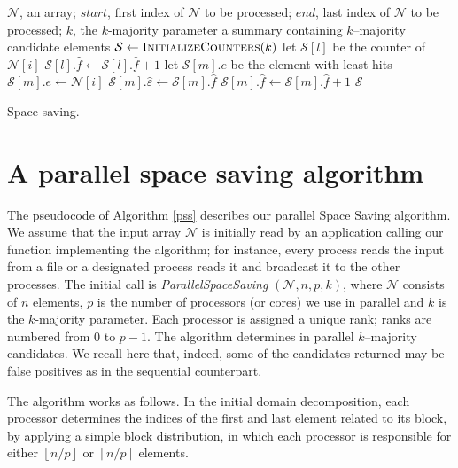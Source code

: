 \documentclass[final,3p,times]{elsarticle}
\begin{document}
\begin{algorithm}
\begin{algorithmic}[1]
\Require $\mathcal{N}$, an array; $start$, first index of $\mathcal{N}$ to be processed; $end$, last index of $\mathcal{N}$ to be processed; $k$, the $k$-majority parameter
\Ensure a summary containing $k$--majority candidate elements
\State $\mathcal{S} \leftarrow \Call{InitializeCounters}{k}$
		\State let $\mathcal{S}[l]$ be the counter of $\mathcal{N}[i]$ 
		\State $\mathcal{S}[l].\hat{f} \leftarrow \mathcal{S}[l].\hat{f} + 1$
	\Else
		\State let $\mathcal{S}[m].e$ be the element with least hits
		\State $\mathcal{S}[m].e \leftarrow \mathcal{N}[i]$ 
		\State $\mathcal{S}[m].\hat{\varepsilon} \leftarrow \mathcal{S}[m].\hat{f}$
		\State $\mathcal{S}[m].\hat{f} \leftarrow \mathcal{S}[m].\hat{f} + 1$
	\EndIf
\EndFor
\State \Return $\mathcal{S}$
\EndProcedure
\caption{Space saving.}
\label{ss}
\end{algorithmic}
\end{algorithm}


\section{A parallel space saving algorithm}

\label{pss-algorithm}

The pseudocode of Algorithm \ref{pss} describes our parallel Space Saving algorithm. We assume that the input array $\mathcal{N}$ is initially read by an application calling our function implementing the algorithm; for instance, every process reads the input from a file or a designated process reads it and broadcast it to the other processes. The initial call is \textit{ParallelSpaceSaving} $(\mathcal{N}, n, p, k)$, where $\mathcal{N}$ consists of $n$ elements, $p$ is the number of processors (or cores) we use in parallel and $k$ is the $k$-majority parameter. Each processor is assigned a unique rank; ranks are numbered from 0 to $p-1$. The algorithm determines in parallel $k$--majority candidates. We recall here that, indeed, some of the candidates returned may be false positives as in the sequential counterpart.

The algorithm works as follows. In the initial domain decomposition, each processor determines the indices of the first and last
element related to its block, by applying a simple block distribution, in which each processor is responsible for either $\left\lfloor {n/p} \right\rfloor$ or $\left\lceil
{n/p} \right\rceil$ elements.
\end{document}
